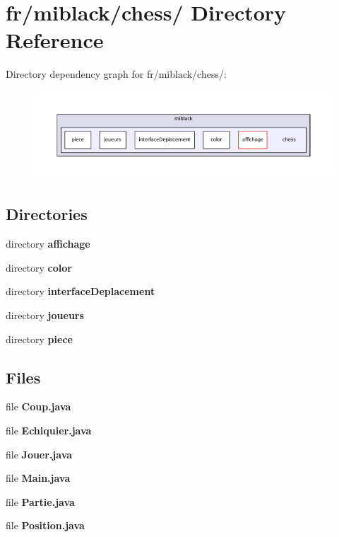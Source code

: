 \section{fr/miblack/chess/ Directory Reference}
\label{dir_566150d2b1e3e2222422eb45d6ceabfc}
Directory dependency graph for fr/miblack/chess/\-:
\nopagebreak
\begin{figure}[H]
\begin{center}
\leavevmode
\includegraphics[width=350pt]{dir_566150d2b1e3e2222422eb45d6ceabfc_dep}
\end{center}
\end{figure}
\subsection*{Directories}
\begin{DoxyCompactItemize}
\item 
directory {\bf affichage}
\item 
directory {\bf color}
\item 
directory {\bf interface\-Deplacement}
\item 
directory {\bf joueurs}
\item 
directory {\bf piece}
\end{DoxyCompactItemize}
\subsection*{Files}
\begin{DoxyCompactItemize}
\item 
file {\bf Coup.\-java}
\item 
file {\bf Echiquier.\-java}
\item 
file {\bf Jouer.\-java}
\item 
file {\bf Main.\-java}
\item 
file {\bf Partie.\-java}
\item 
file {\bf Position.\-java}
\end{DoxyCompactItemize}

